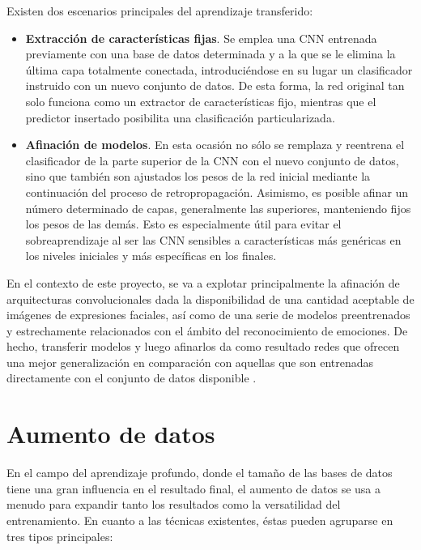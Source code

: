 Existen dos escenarios principales del aprendizaje transferido:
\begin{itemize}
  \item \textbf{Extracción de características fijas}. Se emplea una CNN entrenada previamente con una base de datos determinada y a la que se le elimina la última capa totalmente conectada, introduciéndose en su lugar un clasificador instruido con un nuevo conjunto de datos. De esta forma, la red original tan solo funciona como un extractor de características fijo, mientras que el predictor insertado posibilita una clasificación particularizada.
  \item \textbf{Afinación de modelos}. En esta ocasión no sólo se remplaza y reentrena el clasificador de la parte superior de la CNN con el nuevo conjunto de datos, sino que también son ajustados los pesos de la red inicial mediante la continuación del proceso de retropropagación. Asimismo, es posible afinar un número determinado de capas, generalmente las superiores, manteniendo fijos los pesos de las demás. Esto es especialmente útil para evitar el sobreaprendizaje al ser las CNN sensibles a características más genéricas en los niveles iniciales y más específicas en los finales.
\end{itemize}

En el contexto de este proyecto, se va a explotar principalmente la afinación de arquitecturas convolucionales dada la disponibilidad de una cantidad aceptable de imágenes de expresiones faciales, así como de una serie de modelos preentrenados y estrechamente relacionados con el ámbito del reconocimiento de emociones. De hecho, transferir modelos y luego afinarlos da como resultado redes que ofrecen una mejor generalización en comparación con aquellas que son entrenadas directamente con el conjunto de datos disponible \cite{TransferLearning}.

\section{Aumento de datos} \label{Chapter:DataAugmentation}

En el campo del aprendizaje profundo, donde el tamaño de las bases de datos tiene una gran influencia en el resultado final, el aumento de datos se usa a menudo para expandir tanto los resultados como la versatilidad del entrenamiento. En cuanto a las técnicas existentes, éstas pueden agruparse en tres tipos principales:

